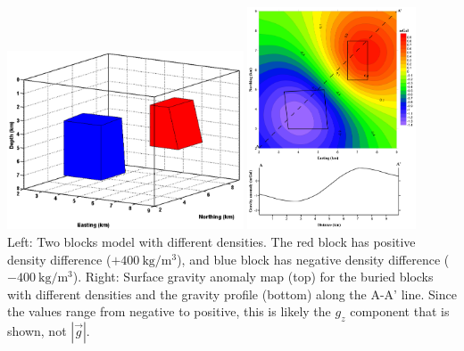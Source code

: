 \begin{center}
\includegraphics[width=7cm]{python_codes/fieldstone_113/images/uwms19_c}
\includegraphics[width=5cm]{python_codes/fieldstone_113/images/uwms19_d}\\
{\captionfont Left: Two blocks model with different densities. The red block 
has positive density difference ($+400~\si{\kg\per\cubic\meter}$), and blue block has negative density
difference ($-400~\si{\kg\per\cubic\meter}$). Right: Surface gravity anomaly map (top) for the 
buried blocks with different densities and the gravity profile (bottom) along the A-A' line.
Since the values range from negative to positive, this is likely the $g_z$
component that is shown, not $|\vec{g}|$.}
\end{center}

